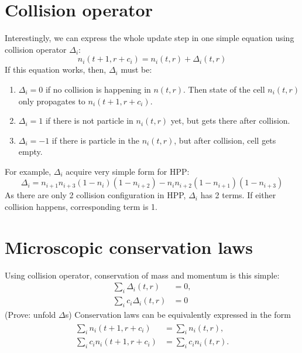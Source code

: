\section{Collision operator}
Interestingly, we can express the whole update step in one simple equation using collision operator $\Delta_i$:
\begin{equation}
n_i(t+1,r+c_i) = n_i(t,r) + \Delta_i(t,r)
\end{equation}
If this equation works, then, $\Delta_i$ must be:
\begin{enumerate}
\item $\Delta_i = 0$ if no collision is happening in $n(t,r)$. Then state of the cell $n_i(t,r)$ only propagates to $n_i(t+1,r+c_i)$.
\item $\Delta_i = 1$ if there is not particle in $n_i(t,r)$ yet, but gets there after collision. 
 \item $\Delta_i = -1$ if there is particle in the $n_i(t,r)$, but after collision, cell gets empty.
\end{enumerate}

\bigskip

For example, $\Delta_i$ acquire very simple form for HPP:
\begin{equation}
\Delta_i = n_{i+1} n_{i+3}( 1 - n_i)(1 - n_{i+2}) - n_i n_{i+2}(1-n_{i+1})(1 - n_{i+3})
\end{equation}
As there are only 2 collision configuration in HPP, $\Delta_i$ has 2 terms.
If either collision happens, corresponding term is 1.

\section{Microscopic conservation laws}
Using collision operator, conservation of mass and momentum is this simple:
\begin{subequations}
\begin{align}
\sum_i \Delta_i(t,r) &= 0,\\
%
\sum_i c_i \Delta_i(t,r) &= 0
\end{align}
\end{subequations}
(Prove: unfold $\Delta$s)
Conservation laws can be equivalently expressed in the form
\begin{align} \label{cons1}
\begin{split}
\sum_i n_i(t+1, r + c_i) &= \sum_i n_i(t,r), \\
\sum_i c_i n_i(t+1, r + c_i) &= \sum_i c_i n_i(t,r).
\end{split}
\end{align}

